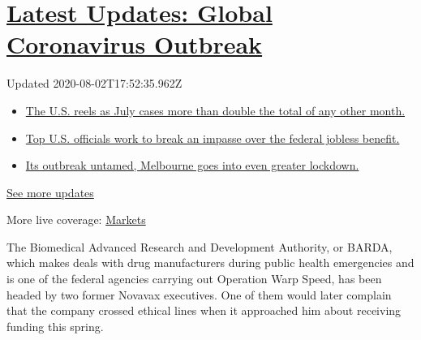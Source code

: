 \hypertarget{latest-updates-global-coronavirus-outbreak}{%
\section{\texorpdfstring{\href{https://www.nytimes.com/2020/08/01/world/coronavirus-covid-19.html?action=click\&pgtype=Article\&state=default\&region=MAIN_CONTENT_1\&context=storylines_live_updates}{Latest
Updates: Global Coronavirus
Outbreak}}{Latest Updates: Global Coronavirus Outbreak}}\label{latest-updates-global-coronavirus-outbreak}}

Updated 2020-08-02T17:52:35.962Z

\begin{itemize}
\tightlist
\item
  \href{https://www.nytimes.com/2020/08/01/world/coronavirus-covid-19.html?action=click\&pgtype=Article\&state=default\&region=MAIN_CONTENT_1\&context=storylines_live_updates\#link-34047410}{The
  U.S. reels as July cases more than double the total of any other
  month.}
\item
  \href{https://www.nytimes.com/2020/08/01/world/coronavirus-covid-19.html?action=click\&pgtype=Article\&state=default\&region=MAIN_CONTENT_1\&context=storylines_live_updates\#link-780ec966}{Top
  U.S. officials work to break an impasse over the federal jobless
  benefit.}
\item
  \href{https://www.nytimes.com/2020/08/01/world/coronavirus-covid-19.html?action=click\&pgtype=Article\&state=default\&region=MAIN_CONTENT_1\&context=storylines_live_updates\#link-2bc8948}{Its
  outbreak untamed, Melbourne goes into even greater lockdown.}
\end{itemize}

\href{https://www.nytimes.com/2020/08/01/world/coronavirus-covid-19.html?action=click\&pgtype=Article\&state=default\&region=MAIN_CONTENT_1\&context=storylines_live_updates}{See
more updates}

More live coverage:
\href{https://www.nytimes.com/live/2020/07/31/business/stock-market-today-coronavirus?action=click\&pgtype=Article\&state=default\&region=MAIN_CONTENT_1\&context=storylines_live_updates}{Markets}

The Biomedical Advanced Research and Development Authority, or BARDA,
which makes deals with drug manufacturers during public health
emergencies and is one of the federal agencies carrying out Operation
Warp Speed, has been headed by two former Novavax executives. One of
them would later complain that the company crossed ethical lines when it
approached him about receiving funding this spring.

